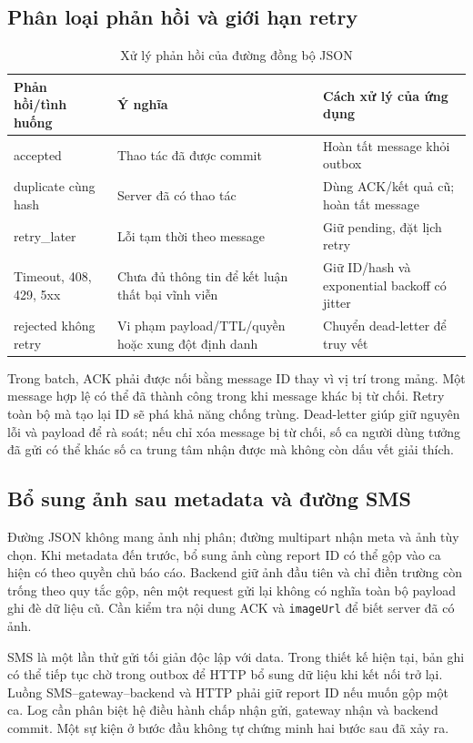 \subsection{Phân loại phản hồi và giới hạn retry}
\begin{table}[htbp]\centering\small
\caption{Xử lý phản hồi của đường đồng bộ JSON}\label{tab:sync-outcomes}
\begin{tabularx}{\textwidth}{P{.24\textwidth}P{.30\textwidth}X}
\toprule Phản hồi/tình huống & Ý nghĩa & Cách xử lý của ứng dụng \\\midrule
accepted & Thao tác đã được commit & Hoàn tất message khỏi outbox \\
duplicate cùng hash & Server đã có thao tác & Dùng ACK/kết quả cũ; hoàn tất message \\
retry\_later & Lỗi tạm thời theo message & Giữ pending, đặt lịch retry \\
Timeout, 408, 429, 5xx & Chưa đủ thông tin để kết luận thất bại vĩnh viễn & Giữ ID/hash và exponential backoff có jitter \\
rejected không retry & Vi phạm payload/TTL/quyền hoặc xung đột định danh & Chuyển dead-letter để truy vết \\
\bottomrule\end{tabularx}
\end{table}

Trong batch, ACK phải được nối bằng message ID thay vì vị trí trong mảng. Một message hợp lệ có thể đã thành công trong khi message khác bị từ chối. Retry toàn bộ mà tạo lại ID sẽ phá khả năng chống trùng. Dead-letter giúp giữ nguyên lỗi và payload để rà soát; nếu chỉ xóa message bị từ chối, số ca người dùng tưởng đã gửi có thể khác số ca trung tâm nhận được mà không còn dấu vết giải thích.

\subsection{Bổ sung ảnh sau metadata và đường SMS}
Đường JSON không mang ảnh nhị phân; đường multipart nhận meta và ảnh tùy chọn. Khi metadata đến trước, bổ sung ảnh cùng report ID có thể gộp vào ca hiện có theo quyền chủ báo cáo. Backend giữ ảnh đầu tiên và chỉ điền trường còn trống theo quy tắc gộp, nên một request gửi lại không có nghĩa toàn bộ payload ghi đè dữ liệu cũ. Cần kiểm tra nội dung ACK và \texttt{imageUrl} để biết server đã có ảnh.

SMS là một lần thử gửi tối giản độc lập với data. Trong thiết kế hiện tại, bản ghi có thể tiếp tục chờ trong outbox để HTTP bổ sung dữ liệu khi kết nối trở lại. Luồng SMS--gateway--backend và HTTP phải giữ report ID nếu muốn gộp một ca. Log cần phân biệt hệ điều hành chấp nhận gửi, gateway nhận và backend commit. Một sự kiện ở bước đầu không tự chứng minh hai bước sau đã xảy ra.

